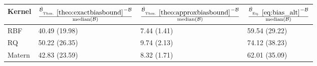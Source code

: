 \begin{tabular}{llll}
  \toprule
Kernel & $\frac{\hat{\mathcal{B}}_{\mathrm{Thm.}~\ref{theo:exactbiasbound}} - \mathcal{B}}{\mathrm{median}(\mathcal{B})}$ & $\frac{\hat{\mathcal{B}}_{\mathrm{Thm.}~\ref{theo:approxbiasbound}} - \mathcal{B}}{\mathrm{median}(\mathcal{B})}$ & $\frac{\hat{\mathcal{B}}_{\mathrm{Eq.}~\eqref{eq:bias_alt}} - \mathcal{B}}{\mathrm{median}(\mathcal{B})}$ \\ 
  \midrule
RBF & 40.49 (19.98) & 7.44 (1.41) & 59.54 (29.22) \\ 
  RQ & 50.22 (26.35) & 9.74 (2.13) & 74.12 (38.23) \\ 
  Matern & 42.83 (23.59) & 8.32 (1.71) & 62.01 (35.09) \\ 
   \bottomrule
\end{tabular}
